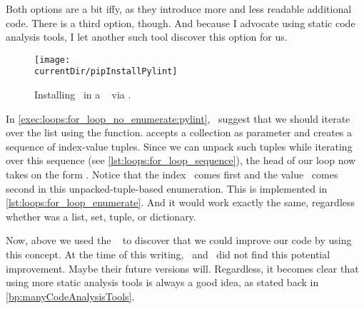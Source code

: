 Both options are a bit iffy, as they introduce more and less readable additional code.
There is a third option, though.
And because I advocate using static code analysis tools, I let another such tool discover this option for us.%
%
\begin{figure}%
\centering%
\texttt{[image: \\currentDir/pipInstallPylint]}%
\caption{Installing \pylint\ in a \ubuntu\  via \pip.}%
\label{fig:pipInstallPylint}%
\end{figure}%
%
%
%
%
%
%
%
In \cref{exec:loops:for_loop_no_enumerate:pylint}, \pylint\ suggest that we should iterate over the list  using the  function.
 accepts a collection as parameter and creates a sequence of index-value tuples.
Since we can unpack such tuples while iterating over this sequence (see \cref{lst:loops:for_loop_sequence}), the head of our loop now takes on the form .
Notice that the index~ comes first and the value~ comes second in this unpacked-tuple-based enumeration.
This is implemented in \cref{lst:loops:for_loop_enumerate}.
And it would work exactly the same, regardless whether  was a list, set, tuple, or dictionary.

Now, above we used the \pylint\  to discover that we could improve our code by using this concept.
At the time of this writing, \ruff\ and \mypy\ did not find this potential improvement.
Maybe their future versions will.
Regardless, it becomes clear that using more static analysis tools is always a good idea, as stated back in \cref{bp:manyCodeAnalysisTools}.%
%
\endhsection%
%
\endhsection%
%
